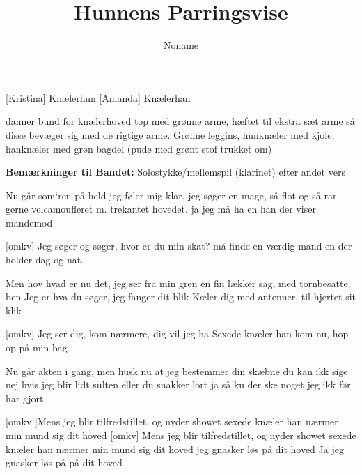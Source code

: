 \documentclass[a4paper,11pt]{article}
\title{Hunnens Parringsvise}
\author{Noname}
\begin{document}
\maketitle

\begin{roles}
[Kristina] Knælerhun
[Amanda] Knælerhan
\end{roles}

\begin{props}
     danner bund for knælerhoved
     top med grønne arme, hæftet til ekstra sæt arme så disse bevæger sig med de rigtige arme. Grønne leggins, hunknæler med kjole, hanknæler med grøn bagdel (pude med grønt stof trukket om)
\end{props}

\textbf{Bemærkninger til Bandet:} Solostykke/mellemspil (klarinet) efter andet vers 

\begin{song}
  Nu går som`ren på held
jeg føler mig klar, jeg søger en
mage, så flot og så rar
gerne velcamoufleret m. trekantet hovedet.
ja jeg må ha en han der viser mandemod

  [omkv] Jeg søger og søger, hvor er du min skat?
må finde en værdig mand
en der holder dag og nat.

Men hov hvad er nu det,
jeg ser fra min gren
en fin lækker sag, med tornbesatte ben
 Jeg er hva du søger, jeg fanger dit blik
Kæler dig med antenner, til hjertet sit klik

 [omkv] Jeg ser dig, kom nærmere, dig vil jeg ha
Sexede knæler han
kom nu, hop op på min bag


 Nu går akten i gang,
men husk nu at jeg
bestemmer din skæbne
du kan ikk sige nej
hvis jeg blir lidt sulten eller du snakker lort
ja så ku der ske noget jeg ikk før har gjort

 [omkv ]Mens jeg blir tilfredstillet, og nyder showet
sexede knæler han
nærmer min mund sig dit hoved
 [omkv] Mens jeg blir tilfredstillet, og nyder showet
sexede knæler han
nærmer min mund sig dit hoved
jeg gnasker løs på dit hoved
Ja jeg gnasker løs på på dit hoved

\end{song}
\end{document}
